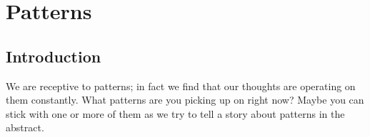 \documentclass[DynamicalBook]{subfiles}
\begin{document}
%


\setcounter{chapter}{4}%


\chapter{Patterns}\label{chapter.5}

\section{Introduction}\label{sec.c5_intro}


We are receptive to patterns; in fact we find that our thoughts are operating on them constantly. What patterns are you picking up on right now? Maybe you can stick with one or more of them as we try to tell a story about patterns in the abstract.
\end{document}
